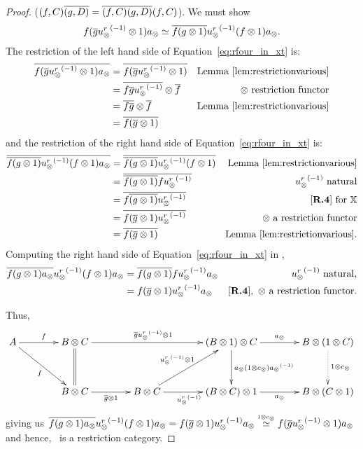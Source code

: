 \begin{proof}
      \rfour ($(f,C) \overline{(g,D)} = \overline{(f,C) (g,D)} (f,C)$). We must show
      \begin{equation}
        f (\overline{g} {u_{\otimes}^r}^{(-1)}\otimes 1) a_{\otimes} \overset{\scriptscriptstyle }{\simeq}
        \overline{f (g \otimes 1)} {u_{\otimes}^r}^{(-1)} (f\otimes 1) a_{\otimes}.
        \label{eq:rfour_in_xt}
      \end{equation}
      The restriction of the left hand side of Equation~\ref{eq:rfour_in_xt} is:
      \begin{align*}
        \overline{f (\overline{g} {u_{\otimes}^r}^{(-1)}\otimes 1) a_{\otimes}}
          & = \overline{f (\overline{g} {u_{\otimes}^r}^{(-1)}\otimes 1)} & \text{Lemma \ref{lem:restrictionvarious}} \\
        & = \overline{f \overline{g} {u_{\otimes}^r}^{(-1)}} \otimes \overline{f} & \otimes \text{ restriction functor}\\
        & = \overline{f \overline{g}} \otimes \overline{f} & \text{Lemma \ref{lem:restrictionvarious}} \\
        & = \overline{f (\overline{g} \otimes 1)}
      \end{align*}
      and the restriction of the right hand side of Equation~\ref{eq:rfour_in_xt}  is:
      \begin{align*}
        \rst{\rst{f (g \* 1)} \inv{\usr} (f\* 1) a_{\*}}
          & = \rst{\rst{f (g \* 1)} \inv{\usr} (f\* 1) } &  \text{Lemma \ref{lem:restrictionvarious}}\\
        & = \rst{\rst{f (g \* 1)} f \inv{\usr}  } & \inv{\usr} \text{ natural}\\
        & = \rst{f \rst{(g \* 1)}  \inv{\usr}  } & \text{ \rfour for }\X\\
        & = \rst{f (\rst{g} \* 1)  \inv{\usr}  } & \* \text{ a restriction functor}\\
        & = \rst{f (\rst{g} \* 1)    } & \text{Lemma \ref{lem:restrictionvarious}.}
      \end{align*}
      Computing the right hand side of Equation~\ref{eq:rfour_in_xt} in \X,
      \begin{align*}
        \rst{f(g\* 1)a_{\*}} \inv{\usr} (f\* 1) a_{\*}
          & = \rst{f(g\* 1)} f \inv{\usr} a_{\*} & \inv{\usr}\text{ natural,}\\
        & = f (\rst{g} \* 1) \inv{\usr} a_{\*} & \rfour,\ \*\text{ a restriction functor}.
      \end{align*}

      Thus,
      \[
        \xymatrix @C=40pt @R=35pt{
          A \ar[r]^f \ar[dr]_{f}
            & B\* C \ar[rr]^{\restr{g} \inv{\usr}\* 1} \ar@{=}[d]
            &
            & (B\* 1) \* C \ar[r]^{a_{\*}} \ar[d]^{a_{\*}(1\*c_{\*})\inv{a_{\*}}}
            & B \* (1 \* C)\ar@{.>}[d]^{1\*c_{\*}}\\
          & B\*C \ar[r]_{\rst{g}\*1}
            & B \* C \ar[r]_{\inv{\usr}}\ar[ur]^{\inv{\usr}\*1}
            & (B \* C) \* 1 \ar[r]_{a_{\*}}
            & B \* (C\*1)
        }
      \]
  giving us $\overline{f(g\otimes 1)a_{\otimes}} {u_{\otimes}^r}^{(-1)} (f\otimes 1) a_{\otimes} = f (\overline{g} \otimes 1) {u_{\otimes}^r}^{(-1)} a_{\otimes}
  \overset{\scriptscriptstyle 1\otimes c_{\otimes}}{\simeq} f (\overline{g} {u_{\otimes}^r}^{(-1)}\otimes 1) a_{\otimes}$ and hence, \Xt\ is a restriction category.
\end{proof}
